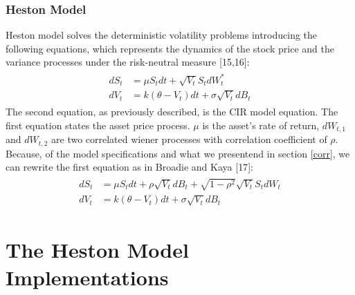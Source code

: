 \documentclass[12pt,twoside]{reedthesis}
\theoremstyle{definition}
\theoremstyle{definition}
\theoremstyle{remark}
\begin{document}
  \subsection{Heston Model}\label{heston-model}
  
  Heston model solves the deterministic volatility problems introducing
  the following equations, which represents the dynamics of the stock
  price and the variance processes under the risk-neutral measure
  {[}15,16{]}:
  \begin{align}
  \label{eq:heston}
  \begin{split}
  dS_t &= \mu S_t dt + \sqrt{V_t} S_t dW^*_t \\
  dV_t &= k(\theta - V_t)dt + \sigma \sqrt{V_t} dB_t
  \end{split}
  \end{align}
  The second equation, as previously described, is the CIR model equation.
  The first equation states the asset price process. \(\mu\) is the
  asset's rate of return, \(dW_{t,1}\) and \(dW_{t,2}\) are two correlated
  wiener processes with correlation coefficient of \(\rho\). Because, of
  the model specifications and what we presentend in section \ref{corr},
  we can rewrite the first equation as in Broadie and Kaya {[}17{]}:
  \begin{align}
  \label{eq:heston2}
  \begin{split}
  dS_t &= \mu S_t dt + \rho \sqrt{V_t} dB_t + \sqrt{1 - \rho^2} \sqrt{V_t} S_t dW_t \\
  dV_t &= k(\theta - V_t)dt + \sigma \sqrt{V_t} dB_t
  \end{split}
  \end{align}
  \chapter{The Heston Model
  Implementations}\label{the-heston-model-implementations}
  
\end{document}
